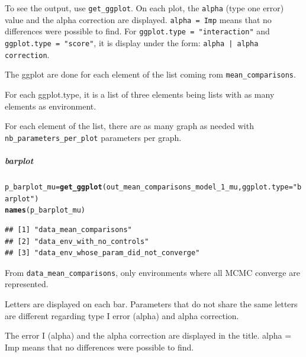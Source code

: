 \documentclass{book}\usepackage[]{graphicx}\usepackage[]{color}
\makeatletter
\newcommand{\hlstr}[1]{\textcolor[rgb]{0.192,0.494,0.8}{#1}}%
\newcommand{\hlstd}[1]{\textcolor[rgb]{0.345,0.345,0.345}{#1}}%
\newcommand{\hlkwb}[1]{\textcolor[rgb]{0.69,0.353,0.396}{#1}}%
\newcommand{\hlkwc}[1]{\textcolor[rgb]{0.333,0.667,0.333}{#1}}%
\newcommand{\hlkwd}[1]{\textcolor[rgb]{0.737,0.353,0.396}{\textbf{#1}}}%
\newenvironment{kframe}{%
 \def\at@end@of@kframe{}%
 \ifinner\ifhmode%
  \def\at@end@of@kframe{\end{minipage}}%
  \begin{minipage}{\columnwidth}%
 \fi\fi%
 \def\FrameCommand##1{\hskip\@totalleftmargin \hskip-\fboxsep
 \colorbox{shadecolor}{##1}\hskip-\fboxsep
     \hskip-\linewidth \hskip-\@totalleftmargin \hskip\columnwidth}%
 \MakeFramed {\advance\hsize-\width
   \@totalleftmargin\z@ \linewidth\hsize
   \@setminipage}}%
 {\par\unskip\endMakeFramed%
 \at@end@of@kframe}
\newenvironment{knitrout}{}{} %
\makeatother
\begin{document}
To see the output, use \texttt{get\_ggplot}.
On each plot, the \texttt{alpha} (type one error) value and the alpha correction are displayed.
\texttt{alpha = Imp} means that no differences were possible to find.
For \texttt{ggplot.type = "interaction"} and \texttt{ggplot.type = "score"}, it is display under the form: \texttt{alpha | alpha correction}.

The ggplot are done for each element of the list coming rom \texttt{mean\_comparisons}.

For each ggplot.type, it is a list of three elements being lists with as many elements as environment. 

For each element of the list, there are as many graph as needed with \texttt{nb\_parameters\_per\_plot} parameters per graph.

\subparagraph{barplot}

\begin{knitrout}
\color{fgcolor}\begin{kframe}
\begin{alltt}
\hlstd{p_barplot_mu} \hlkwb{=} \hlkwd{get_ggplot}\hlstd{(out_mean_comparisons_model_1_mu,} \hlkwc{ggplot.type} \hlstd{=} \hlstr{"barplot"}\hlstd{)}
\hlkwd{names}\hlstd{(p_barplot_mu)}
\end{alltt}
\begin{verbatim}
## [1] "data_mean_comparisons"                
## [2] "data_env_with_no_controls"            
## [3] "data_env_whose_param_did_not_converge"
\end{verbatim}
\end{kframe}
\end{knitrout}

From \texttt{data\_mean\_comparisons}, only environments where all MCMC converge are represented.

Letters are displayed on each bar. Parameters that do not share the same letters are different regarding type I error (alpha) and alpha correction. 

The error I (alpha) and the alpha correction are displayed in the title. 
alpha = Imp means that no differences were possible to find.
\end{document}
